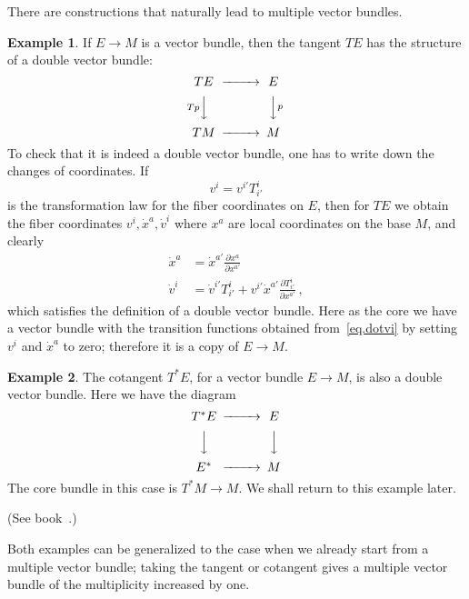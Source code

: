 \documentclass[12pt,reqno,a4paper]{amsart}
\theoremstyle{definition}
\newtheorem{ex}{Example}[section]
\begin{document}
There are constructions that naturally lead to multiple vector bundles.

\begin{ex} If $E\to M$ is a vector bundle, then the tangent $TE$ has the structure of a double vector bundle:
\begin{equation*} 
    \begin{CD} TE@>>> E\\
                @V{Tp}VV  @VV{p}V \\
                TM@>>>M
    \end{CD}
\end{equation*}
To check that it is indeed a double vector bundle, one has to write down the changes of coordinates. If
\begin{equation*}
    v^i=v^{i'}T_{i'}^{i}
\end{equation*}
is the transformation law for the fiber coordinates on $E$, then for $TE$ we obtain the fiber coordinates $v^i,\dot x^a, \dot v^i$ where $x^a$ are local coordinates on the base $M$, and clearly
\begin{align}
    \dot x^a&=\dot x^{a'}{{\frac{\partial {{x^a}}}{\partial {{x^{a'}}}}}}\\
    \dot v^i&= \dot v^{i'}T_{i'}^{i}+ v^{i'} \dot x^{a'}{{\frac{\partial {{T_{i'}^{i}}}}{\partial {{x^{a'}}}}}}\,,\label{eq.dotvi}
\end{align}
which satisfies the definition of a double vector bundle. Here as the core we have a vector bundle with the transition functions obtained from~\eqref{eq.dotvi} by setting $v^i$ and $\dot x^a$ to zero; therefore it is a copy of $E\to M$.
\end{ex}

\begin{ex} The cotangent  $T^*E$, for a vector bundle $E\to M$, is also a double vector bundle. Here we have the diagram
\begin{equation*} 
    \begin{CD} T^*E@>>> E\\
                @VVV  @VVV \\
                E^*@>>>M
    \end{CD}
\end{equation*}
The core bundle in this case is $T^*M\to M$. We shall return to this example later.
\end{ex}

(See book~\cite{mackenzie:book2005}.)

Both examples can be generalized to the case when we already start from a multiple vector bundle; taking the tangent or cotangent gives a  multiple vector bundle of the multiplicity increased by one.
\end{document}
